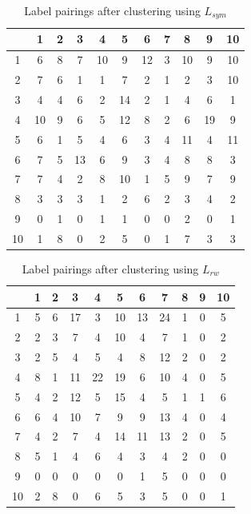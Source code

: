\documentclass[conference]{IEEEtran}
\begin{document}
\begin{table}[h]
\renewcommand{\arraystretch}{1.2}
\caption{Label pairings after clustering using $L_{sym}$} \label{tab:pairing2}
\centering
\begin{tabular}{c||cccccccccc}
& 1 & 2 & 3 & 4 & 5 & 6 & 7 & 8 & 9 & 10\\
\hline \hline
1 & 6 & 8 & 7 & 10 & 9 & 12 & 3 & 10 & 9 & 10\\ 
2 & 7 & 6 & 1 & 1 & 7 & 2 & 1 & 2 & 3 & 10\\ 
3 & 4 & 4 & 6 & 2 & 14 & 2 & 1 & 4 & 6 & 1\\ 
4 & 10 & 9 & 6 & 5 & 12 & 8 & 2 & 6 & 19 & 9\\ 
5 & 6 & 1 & 5 & 4 & 6 & 3 & 4 & 11 & 4 & 11\\ 
6 & 7 & 5 & 13 & 6 & 9 & 3 & 4 & 8 & 8 & 3\\ 
7 & 7 & 4 & 2 & 8 & 10 & 1 & 5 & 9 & 7 & 9\\ 
8 & 3 & 3 & 3 & 1 & 2 & 6 & 2 & 3 & 4 & 2\\ 
9 & 0 & 1 & 0 & 1 & 1 & 0 & 0 & 2 & 0 & 1\\ 
10 & 1 & 8 & 0 & 2 & 5 & 0 & 1 & 7 & 3 & 3 
\end{tabular}
\end{table}


\begin{table}[h]
\renewcommand{\arraystretch}{1.2}
\caption{Label pairings after clustering using $L_{rw}$} \label{tab:pairing3}
\centering
\begin{tabular}{c||cccccccccc}
& 1 & 2 & 3 & 4 & 5 & 6 & 7 & 8 & 9 & 10\\
\hline \hline
1 & 5 & 6 & 17 & 3 & 10 & 13 & 24 & 1 & 0 & 5\\ 
2 & 2 & 3 & 7 & 4 & 10 & 4 & 7 & 1 & 0 & 2\\ 
3 & 2 & 5 & 4 & 5 & 4 & 8 & 12 & 2 & 0 & 2\\ 
4 & 8 & 1 & 11 & 22 & 19 & 6 & 10 & 4 & 0 & 5\\ 
5 & 4 & 2 & 12 & 5 & 15 & 4 & 5 & 1 & 1 & 6\\ 
6 & 6 & 4 & 10 & 7 & 9 & 9 & 13 & 4 & 0 & 4\\ 
7 & 4 & 2 & 7 & 4 & 14 & 11 & 13 & 2 & 0 & 5\\ 
8 & 5 & 1 & 4 & 6 & 4 & 3 & 4 & 2 & 0 & 0\\ 
9 & 0 & 0 & 0 & 0 & 0 & 1 & 5 & 0 & 0 & 0\\ 
10 & 2 & 8 & 0 & 6 & 5 & 3 & 5 & 0 & 0 & 1 
\end{tabular}
\end{table}
\end{document}
